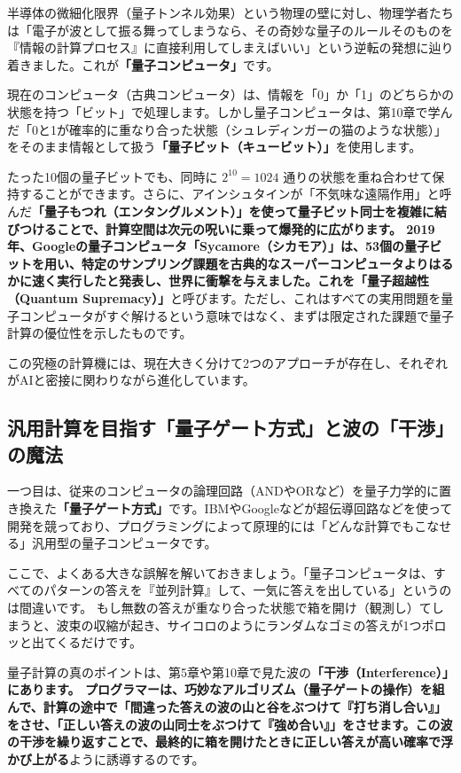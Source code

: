 半導体の微細化限界（量子トンネル効果）という物理の壁に対し、物理学者たちは「電子が波として振る舞ってしまうなら、その奇妙な量子のルールそのものを『情報の計算プロセス』に直接利用してしまえばいい」という逆転の発想に辿り着きました。これが\textbf{「量子コンピュータ」}です。

現在のコンピュータ（古典コンピュータ）は、情報を「0」か「1」のどちらかの状態を持つ「ビット」で処理します。しかし量子コンピュータは、第10章で学んだ「0と1が確率的に重なり合った状態（シュレディンガーの猫のような状態）」をそのまま情報として扱う\textbf{「量子ビット（キュービット）」}を使用します。

たった10個の量子ビットでも、同時に \(2^{10}=1024\) 通りの状態を重ね合わせて保持することができます。さらに、アインシュタインが「不気味な遠隔作用」と呼んだ\textbf{「量子もつれ（エンタングルメント）」を使って量子ビット同士を複雑に結びつけることで、計算空間は次元の呪いに乗って爆発的に広がります。 2019年、Googleの量子コンピュータ「Sycamore（シカモア）」は、53個の量子ビットを用い、特定のサンプリング課題を古典的なスーパーコンピュータよりはるかに速く実行したと発表し、世界に衝撃を与えました。これを「量子超越性（Quantum Supremacy）」}と呼びます。ただし、これはすべての実用問題を量子コンピュータがすぐ解けるという意味ではなく、まずは限定された課題で量子計算の優位性を示したものです。

この究極の計算機には、現在大きく分けて2つのアプローチが存在し、それぞれがAIと密接に関わりながら進化しています。

\subsection{汎用計算を目指す「量子ゲート方式」と波の「干渉」の魔法}

一つ目は、従来のコンピュータの論理回路（ANDやORなど）を量子力学的に置き換えた\textbf{「量子ゲート方式」}です。IBMやGoogleなどが超伝導回路などを使って開発を競っており、プログラミングによって原理的には「どんな計算でもこなせる」汎用型の量子コンピュータです。

ここで、よくある大きな誤解を解いておきましょう。「量子コンピュータは、すべてのパターンの答えを『並列計算』して、一気に答えを出している」というのは間違いです。 もし無数の答えが重なり合った状態で箱を開け（観測し）てしまうと、波束の収縮が起き、サイコロのようにランダムなゴミの答えが1つポロッと出てくるだけです。

量子計算の真のポイントは、第5章や第10章で見た波の\textbf{「干渉（Interference）」にあります。 プログラマーは、巧妙なアルゴリズム（量子ゲートの操作）を組んで、計算の途中で「間違った答えの波の山と谷をぶつけて『打ち消し合い』」をさせ、「正しい答えの波の山同士をぶつけて『強め合い』」をさせます。この波の干渉を繰り返すことで、最終的に箱を開けたときに正しい答えが高い確率で浮かび上がる}ように誘導するのです。

